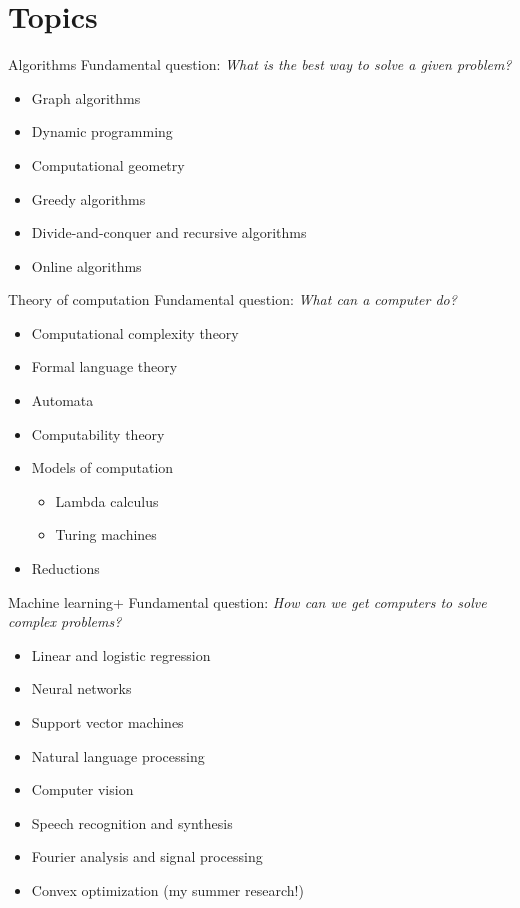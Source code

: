 \documentclass{beamer}
\begin{document}
\section{Topics}

\begin{frame}{Algorithms}
Fundamental question: \textit{What is the best way to solve a given problem?}
\vspace{0.1in}

\begin{itemize}
\item Graph algorithms
\item Dynamic programming
\item Computational geometry
\item Greedy algorithms
\item Divide-and-conquer and recursive algorithms
\item Online algorithms
\end{itemize}
\end{frame}

\begin{frame}{Theory of computation}
Fundamental question: \textit{What can a computer do?}
\vspace{0.1in}

\begin{itemize}
\item Computational complexity theory
\item Formal language theory
\item Automata
\item Computability theory
\item Models of computation
\begin{itemize}
\item Lambda calculus
\item Turing machines
\end{itemize}
\item Reductions
\end{itemize}
\end{frame}

\begin{frame}{Machine learning+}
Fundamental question: \textit{How can we get computers to solve complex problems?}
\vspace{0.1in}

\begin{itemize}
\item Linear and logistic regression
\item Neural networks
\item Support vector machines
\item Natural language processing
\item Computer vision
\item Speech recognition and synthesis
\item Fourier analysis and signal processing
\item Convex optimization (my summer research!)
\end{itemize}
\end{frame}
\end{document}
